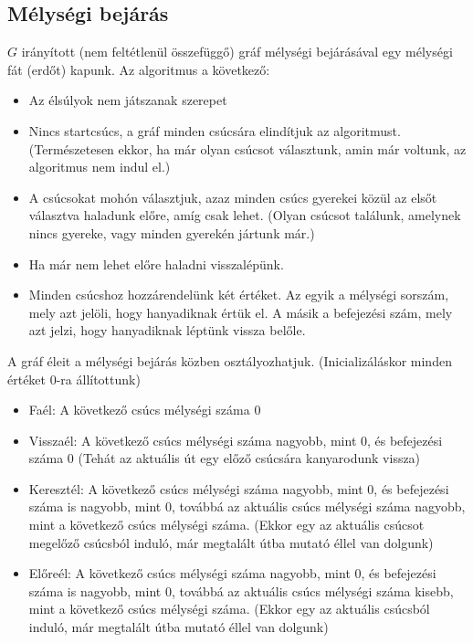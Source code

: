 \documentclass[margin=0px]{article}
\begin{document}
		\subsection{Mélységi bejárás}
			$G$ irányított (nem feltétlenül összefüggő) gráf mélységi bejárásával egy mélységi fát (erdőt) kapunk. Az algoritmus a következő:
			\begin{itemize}
				\item Az élsúlyok nem játszanak szerepet
				\item Nincs startcsúcs, a gráf minden csúcsára elindítjuk az algoritmust. (Természetesen ekkor, ha már olyan csúcsot választunk, amin már voltunk, az algoritmus nem indul el.)
				\item A csúcsokat mohón választjuk, azaz minden csúcs gyerekei közül az elsőt választva haladunk előre, amíg csak lehet. (Olyan csúcsot találunk, amelynek nincs gyereke, vagy minden gyerekén jártunk már.)
				\item Ha már nem lehet előre haladni visszalépünk.
				\item Minden csúcshoz hozzárendelünk két értéket. Az egyik a mélységi sorszám, mely azt jelöli, hogy hanyadiknak értük el. A másik a befejezési szám, mely azt jelzi, hogy hanyadiknak léptünk vissza belőle. 
			\end{itemize}
			A gráf éleit a mélységi bejárás közben osztályozhatjuk. (Inicializáláskor minden értéket 0-ra állítottunk)
			\begin{itemize}
				\item Faél: A következő csúcs mélységi száma 0
				\item Visszaél: A következő csúcs mélységi száma nagyobb, mint 0, és befejezési száma 0 (Tehát az aktuális út egy előző csúcsára kanyarodunk vissza)
				\item Keresztél: A következő csúcs mélységi száma nagyobb, mint 0, és befejezési száma is nagyobb, mint 0, továbbá az aktuális csúcs mélységi száma nagyobb, mint a következő csúcs mélységi száma. (Ekkor egy az aktuális csúcsot megelőző csúcsból induló, már megtalált útba mutató éllel van dolgunk)
				\item Előreél: A következő csúcs mélységi száma nagyobb, mint 0, és befejezési száma is nagyobb, mint 0, továbbá az aktuális csúcs mélységi száma kisebb, mint a következő csúcs mélységi száma. (Ekkor egy az aktuális csúcsból induló, már megtalált útba mutató éllel van dolgunk)
			\end{itemize}
\end{document}
